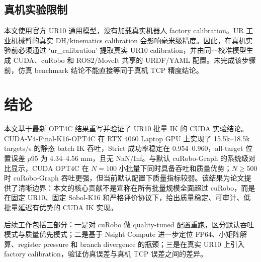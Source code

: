 \documentclass[twocolumn,a4paper,10pt]{ctexart}
\begin{document}
\subsection{真机实验限制}

本文使用官方 UR10 通用模型，没有加载真实机器人 factory calibration。UR 工业机械臂的真实 DH/kinematics calibration 会影响毫米级精度。因此，在真机实验前必须通过 `ur\_calibration' 提取真实 UR10 calibration，并由同一校准模型生成 CUDA、cuRobo 和 ROS2/MoveIt 共享的 URDF/YAML 配置。未完成该步骤前，仿真 benchmark 结论不能直接等同于真机 TCP 精度结论。

\section{结论}

本文基于最新 OPT4C 结果重写并验证了 UR10 批量 IK 的 CUDA 实验结论。CUDA-V4-Final-K16-OPT4C 在 RTX 4060 Laptop GPU 上实现了 15.5k--18.5k targets/s 的静态 batch IK 吞吐，Strict 成功率稳定在 0.954--0.960，all-target 位置误差 $p95$ 为 4.34--4.56 mm，且无 NaN/Inf。与默认 cuRobo-Graph 的系统级对比显示，CUDA OPT4C 在 $N=100$ 小批量下同时具备吞吐和质量优势；$N\ge500$ 时 cuRobo-Graph 吞吐更强，但当前默认配置下质量指标较弱。该结果为论文提供了清晰边界：本文的核心贡献不是宣称在所有批量规模全面超过 cuRobo，而是在固定 UR10、固定 Sobol-K16 和严格评价协议下，给出质量稳定、可审计、低批量延迟有优势的 CUDA IK 实现。

后续工作包括三部分：一是对 cuRobo 做 quality-tuned 配置重跑，区分默认吞吐模式与质量优先模式；二是基于 Nsight Compute 进一步定位 FP64、小矩阵解算、register pressure 和 branch divergence 的瓶颈；三是在真实 UR10 上引入 factory calibration，验证仿真误差与真机 TCP 误差之间的差异。
\end{document}
